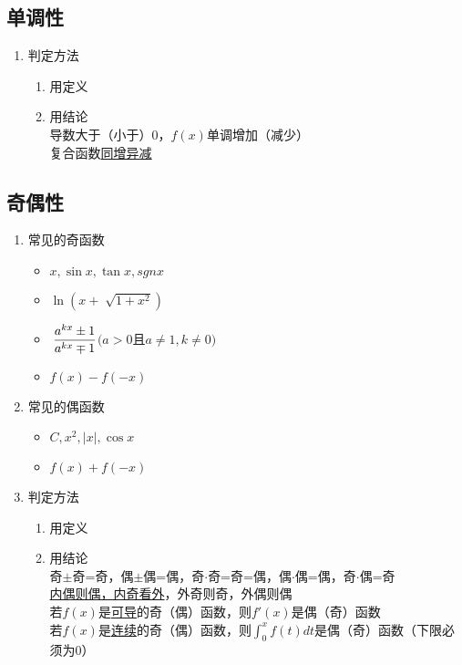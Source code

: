 \subsection{单调性}

\begin{enumerate}
    \item 判定方法\begin{enumerate}
        \item 用定义
        \item 用结论\\
        导数大于（小于）0，$f(x)$单调增加（减少）\\
        复合函数\underline{同增异减}
    \end{enumerate}
\end{enumerate}

\subsection{奇偶性}

\begin{enumerate}
    \item 常见的奇函数\begin{itemize}
        \item $x, \sin x, \tan x, sgn x$
        \item $\ln (x+\sqrt[]{1+x^2})$
        \item $\displaystyle\hspace{.2em}\frac{a^{kx}\pm 1}{a^{kx}\mp 1}$$(a>0$且$a \ne 1, k \ne 0)$
        \item \underline{$f(x)-f(-x)$}
    \end{itemize}
    \item 常见的偶函数\begin{itemize}
        \item $C, x^2, |x|, \cos x$
        \item \underline{$f(x)+f(-x)$}
    \end{itemize}
    \item 判定方法\begin{enumerate}
        \item 用定义
        \item 用结论\\    
        奇$\pm$奇=奇，偶$\pm$偶=偶，奇$\cdot$奇=奇=偶，偶$\cdot$偶=偶，奇$\cdot$偶=奇\\
        \underline{内偶则偶，内奇看外}，外奇则奇，外偶则偶\\
        
        若$f(x)$是\underline{可导}的奇（偶）函数，则$f'(x)$是偶（奇）函数\\
        若$f(x)$是\underline{连续}的奇（偶）函数，则$\int_{0}^{x}f(t)dt$是偶（奇）函数（下限必须为0）
    \end{enumerate}
\end{enumerate}

